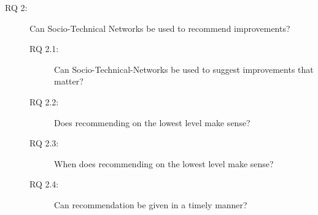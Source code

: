 \begin{description}
%
\item[RQ 2:] Can Socio-Technical Networks be used to recommend improvements? 
  \begin{description}
  \item[RQ 2.1:] Can Socio-Technical-Networks be used to suggest improvements that matter?
  \item[RQ 2.2:] Does recommending on the lowest level make sense?
  \item[RQ 2.3:] When does recommending on the lowest level make sense?
  \item[RQ 2.4:] Can recommendation be given in a timely manner?
  \end{description}
\end{description}



